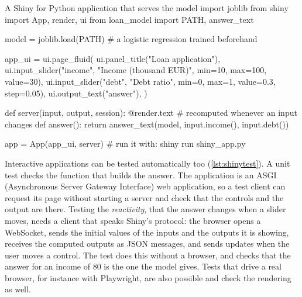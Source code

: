 \begin{pylisting}[label={lst:shinyapp}]{A Shiny for Python application that serves the model}
import joblib
from shiny import App, render, ui
from loan_model import PATH, answer_text

model = joblib.load(PATH)                  # a logistic regression trained beforehand

app_ui = ui.page_fluid(
    ui.panel_title("Loan application"),
    ui.input_slider("income", "Income (thousand EUR)", min=10, max=100, value=30),
    ui.input_slider("debt", "Debt ratio", min=0, max=1, value=0.3, step=0.05),
    ui.output_text("answer"),
)

def server(input, output, session):
    @render.text                           # recomputed whenever an input changes
    def answer():
        return answer_text(model, input.income(), input.debt())

app = App(app_ui, server)                  # run it with: shiny run shiny_app.py
\end{pylisting}

Interactive applications can be tested automatically too (\cref{lst:shinytest}). A unit test checks the
function that builds the answer. The application is an ASGI (Asynchronous Server Gateway Interface) web application, so a test client can request
its page without starting a server and check that the controls and the output are there. Testing the
\emph{reactivity}, that the answer changes when a slider moves, needs a client that speaks Shiny's
protocol: the browser opens a WebSocket, sends the initial values of the inputs and the outputs it is
showing, receives the computed outputs as JSON messages, and sends updates when the user moves a control.
The test does this without a browser, and checks that the answer for an income of 80 is the one
the model gives. Tests that drive a real browser, for instance with Playwright, are also possible and check
the rendering as well.

